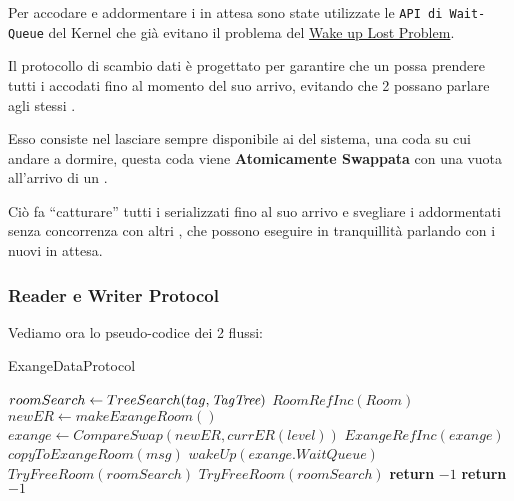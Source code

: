 Per accodare e addormentare i \Reader in attesa sono state utilizzate le  \texttt{API di Wait-Queue} del Kernel che già
evitano il problema del \underline{Wake up Lost Problem}.

Il protocollo di scambio dati è progettato per garantire che un \Writer possa prendere tutti i \Reader accodati fino al
momento del suo arrivo, evitando che 2 \Writer possano parlare agli stessi \Reader.

Esso consiste nel lasciare sempre disponibile ai \Reader del sistema, una coda su cui andare a dormire, questa coda
viene \textbf{Atomicamente Swappata}  con una vuota all'arrivo di un \Writer.

Ciò fa ``catturare'' tutti i \Reader serializzati fino al suo arrivo e svegliare i \Reader addormentati senza
concorrenza con altri \Writer, che possono eseguire in tranquillità parlando con i nuovi \Reader in attesa.

\Writer

\subsubsection{Reader e Writer Protocol}
Vediamo ora lo pseudo-codice dei 2 flussi:

\begin{algorithm}
\caption{\Writer ExangeDataProtocol}\label{writeExange}
\begin{algorithmic}[1]
\State $roomSearch \gets TreeSearch(tag, \textit{TagTree})$
    \State $RoomRefInc(Room)$
        \State $newER \gets makeExangeRoom()$ 
        \State $exange \gets CompareSwap(newER, currER(level))$
        \State $ExangeRefInc(exange)$
        \State $copyToExangeRoom(msg)$
        \State $wakeUp(exange.WaitQueue)$
        \State $TryFreeRoom(roomSearch)$
    \Else
        \State $TryFreeRoom(roomSearch)$
        \State \textbf{return} $-1$
    \EndIf
\Else
    \State \textbf{return} $-1$

\EndIf
\EndProcedure
\end{algorithmic}
\end{algorithm}

